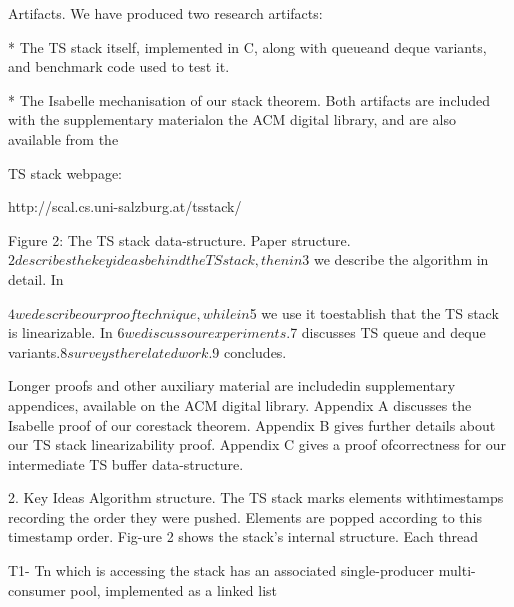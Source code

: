 Artifacts. We have produced two research artifacts:

* The TS stack itself, implemented in C, along with queueand deque variants, and benchmark code used to test it.

* The Isabelle mechanisation of our stack theorem.
Both artifacts are included with the supplementary materialon the ACM digital library, and are also available from the

TS stack webpage:

http://scal.cs.uni-salzburg.at/tsstack/

Figure 2: The TS stack data-structure.
Paper structure. $2 describes the key ideas behind theTS stack, then in $3 we describe the algorithm in detail. In

$4 we describe our proof technique, while in $5 we use it toestablish that the TS stack is linearizable. In $6 we discuss
our experiments. $7 discusses TS queue and deque variants.$8 surveys the related work. $9 concludes.

Longer proofs and other auxiliary material are includedin supplementary appendices, available on the ACM digital
library. Appendix A discusses the Isabelle proof of our corestack theorem. Appendix B gives further details about our
TS stack linearizability proof. Appendix C gives a proof ofcorrectness for our intermediate TS buffer data-structure.

2. Key Ideas
Algorithm structure. The TS stack marks elements withtimestamps recording the order they were pushed. Elements are popped according to this timestamp order. Fig-ure 2 shows the stack's internal structure. Each thread

T1-
Tn which is accessing the stack has an associated single-producer multi-consumer pool, implemented as a linked list


